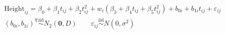 \documentclass[border=2pt]{standalone}
\begin{document}
\(\displaystyle
\begin{gathered}
  \mathrm{Height}_{ij}
    = \beta_0 + \beta_1 t_{ij} + \beta_2 t_{ij}^2
    + w_i(\beta_3 + \beta_4 t_{ij} + \beta_5 t_{ij}^2)
    + b_{0i} + b_{1i}t_{ij} + \varepsilon_{ij} \\[4pt]
  (b_{0i},b_{1i})^\mathsf{T} \overset{\mathrm{iid}}{\sim} N_2(\mathbf{0},D)
  \qquad
  \varepsilon_{ij} \overset{\mathrm{iid}}{\sim} N(0,\sigma^2)
\end{gathered}
\)
\end{document}
